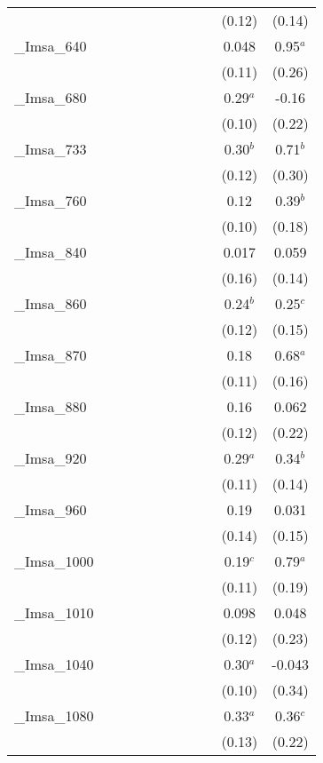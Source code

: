 \documentclass[]{article}
\begin{document}
\begin{tabular}{lcccccccccc}
 &  &  &  &  &  &  &  &  & (0.12) & (0.14) \\
\_Imsa\_640 &  &  &  &  &  &  &  &  & 0.048 & 0.95$^a$ \\
 &  &  &  &  &  &  &  &  & (0.11) & (0.26) \\
\_Imsa\_680 &  &  &  &  &  &  &  &  & 0.29$^a$ & -0.16 \\
 &  &  &  &  &  &  &  &  & (0.10) & (0.22) \\
\_Imsa\_733 &  &  &  &  &  &  &  &  & 0.30$^b$ & 0.71$^b$ \\
 &  &  &  &  &  &  &  &  & (0.12) & (0.30) \\
\_Imsa\_760 &  &  &  &  &  &  &  &  & 0.12 & 0.39$^b$ \\
 &  &  &  &  &  &  &  &  & (0.10) & (0.18) \\
\_Imsa\_840 &  &  &  &  &  &  &  &  & 0.017 & 0.059 \\
 &  &  &  &  &  &  &  &  & (0.16) & (0.14) \\
\_Imsa\_860 &  &  &  &  &  &  &  &  & 0.24$^b$ & 0.25$^c$ \\
 &  &  &  &  &  &  &  &  & (0.12) & (0.15) \\
\_Imsa\_870 &  &  &  &  &  &  &  &  & 0.18 & 0.68$^a$ \\
 &  &  &  &  &  &  &  &  & (0.11) & (0.16) \\
\_Imsa\_880 &  &  &  &  &  &  &  &  & 0.16 & 0.062 \\
 &  &  &  &  &  &  &  &  & (0.12) & (0.22) \\
\_Imsa\_920 &  &  &  &  &  &  &  &  & 0.29$^a$ & 0.34$^b$ \\
 &  &  &  &  &  &  &  &  & (0.11) & (0.14) \\
\_Imsa\_960 &  &  &  &  &  &  &  &  & 0.19 & 0.031 \\
 &  &  &  &  &  &  &  &  & (0.14) & (0.15) \\
\_Imsa\_1000 &  &  &  &  &  &  &  &  & 0.19$^c$ & 0.79$^a$ \\
 &  &  &  &  &  &  &  &  & (0.11) & (0.19) \\
\_Imsa\_1010 &  &  &  &  &  &  &  &  & 0.098 & 0.048 \\
 &  &  &  &  &  &  &  &  & (0.12) & (0.23) \\
\_Imsa\_1040 &  &  &  &  &  &  &  &  & 0.30$^a$ & -0.043 \\
 &  &  &  &  &  &  &  &  & (0.10) & (0.34) \\
\_Imsa\_1080 &  &  &  &  &  &  &  &  & 0.33$^a$ & 0.36$^c$ \\
 &  &  &  &  &  &  &  &  & (0.13) & (0.22) \\

\end{tabular}
\end{document}

